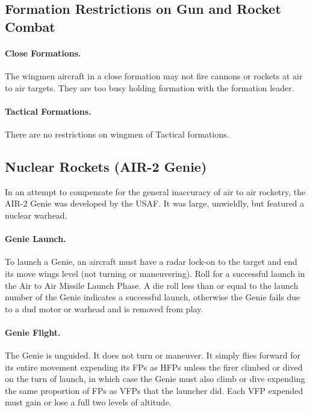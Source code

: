 \subsection{Formation Restrictions on Gun and Rocket Combat}

\paragraph{Close Formations.} The wingmen aircraft in a close formation may not fire cannons or rockets at air to air targets. They are too busy holding formation with the formation leader.

\paragraph{Tactical Formations.} There are no restrictions on wingmen of Tactical formations.

\subsection{Nuclear Rockets (AIR-2 Genie)}


In an attempt to compensate for the general inaccuracy of air to air rocketry, the AIR-2 Genie was developed by the USAF. It was large, unwieldly, but featured a nuclear warhead.

\paragraph{Genie Launch.} To launch a Genie, an aircraft must have a radar lock-on to the target and end its move wings level (not turning or maneuvering). Roll for a successful launch in the Air to Air Missile Launch Phase. A die roll less than or equal to the launch number of the Genie indicates a successful launch, otherwise the Genie fails due to a dud motor or warhead and is removed from play.

\paragraph{Genie Flight.} The Genie is unguided. It does not turn or maneuver. It simply flies forward for its entire movement expending its FPs as HFPs unless the firer climbed or dived on the turn of launch, in which case the Genie must also climb or dive expending the same proportion of FPs as VFPs that the launcher did. Each VFP expended must gain or lose a full two levels of altitude.

